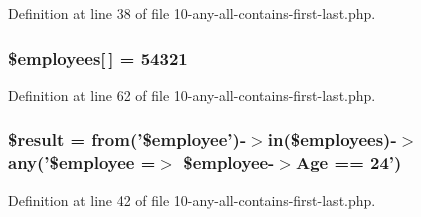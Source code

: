 \-Definition at line 38 of file 10-\/any-\/all-\/contains-\/first-\/last.\-php.

\hypertarget{_linq_to_objects_210-any-all-contains-first-last_8php_ac6c9b1497734c730d854ef71d906cf0f}{
\subsubsection[{\$employees}]{\setlength{\rightskip}{0pt plus 5cm}\$employees\mbox{[}$\,$\mbox{]} = 54321}}\label{_linq_to_objects_210-any-all-contains-first-last_8php_ac6c9b1497734c730d854ef71d906cf0f}


\-Definition at line 62 of file 10-\/any-\/all-\/contains-\/first-\/last.\-php.

\hypertarget{_linq_to_objects_210-any-all-contains-first-last_8php_a112ef069ddc0454086e3d1e6d8d55d07}{
\subsubsection[{\$result}]{\setlength{\rightskip}{0pt plus 5cm}\$result = from('\$employee')-\/$>$in(\$employees)-\/$>$any('\$employee =$>$ \$employee-\/$>$\-Age == 24')}}\label{_linq_to_objects_210-any-all-contains-first-last_8php_a112ef069ddc0454086e3d1e6d8d55d07}


\-Definition at line 42 of file 10-\/any-\/all-\/contains-\/first-\/last.\-php.


